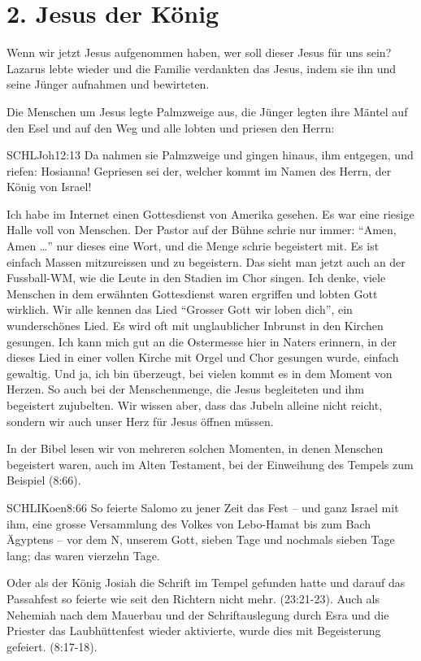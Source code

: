 \documentclass[fontsize=16pt]{mybib}
\begin{document}
    \section{2. Jesus der König}
    Wenn wir jetzt Jesus aufgenommen haben, wer soll dieser Jesus für uns sein? Lazarus lebte wieder und die Familie verdankten das Jesus, indem sie ihn und seine Jünger aufnahmen und bewirteten.

    Die Menschen um Jesus legte Palmzweige aus, die Jünger legten ihre Mäntel auf den Esel und auf den Weg und alle lobten und priesen den Herrn:
    \begin{bibelbox}{SCHL}{Joh}{12:13}
    Da nahmen sie Palmzweige und gingen hinaus, ihm entgegen, und riefen: Hosianna! Gepriesen sei der, welcher kommt im Namen des Herrn, der König von Israel!
    \end{bibelbox}
    Ich habe im Internet einen Gottesdienst von Amerika gesehen. Es war eine riesige Halle voll von Menschen. Der Pastor auf der Bühne schrie nur immer: \enquote{Amen, Amen \dots} nur dieses eine Wort, und die Menge schrie begeistert mit. Es ist einfach Massen mitzureissen und zu begeistern. Das sieht man jetzt auch an der Fussball-WM, wie die Leute in den Stadien im Chor singen.
    Ich denke, viele Menschen in dem erwähnten Gottesdienst waren ergriffen und lobten Gott wirklich.
    Wir alle kennen das Lied \enquote{Grosser Gott wir loben dich}, ein wunderschönes Lied. Es wird oft mit unglaublicher Inbrunst in den Kirchen gesungen. Ich kann mich gut an die Ostermesse hier in Naters erinnern, in der dieses Lied in einer vollen Kirche mit Orgel und Chor gesungen wurde, einfach gewaltig. Und ja, ich bin überzeugt, bei vielen kommt es in dem Moment von Herzen. So auch bei der Menschenmenge, die Jesus begleiteten und ihm begeistert zujubelten. Wir wissen aber, dass das Jubeln alleine nicht reicht, sondern wir auch unser Herz für Jesus öffnen müssen.

    In der Bibel lesen wir von mehreren solchen Momenten, in denen Menschen begeistert waren, auch im Alten Testament, bei der Einweihung des Tempels zum Beispiel (8:66). 
    \begin{bibelbox}{SCHL}{IKoen}{8:66}
        So feierte Salomo zu jener Zeit das Fest -- und ganz Israel mit ihm, eine grosse Versammlung des Volkes von Lebo-Hamat bis zum Bach Ägyptens -- vor dem \herr N, unserem Gott, sieben Tage und nochmals sieben Tage lang; das waren vierzehn Tage.
    \end{bibelbox}
    Oder als der König Josiah die Schrift im Tempel gefunden hatte und darauf das Passahfest so feierte wie seit den Richtern nicht mehr. (23:21-23).
    Auch als Nehemiah nach dem Mauerbau und der Schriftauslegung durch Esra und die Priester das Laubhüttenfest wieder aktivierte, wurde dies mit Begeisterung gefeiert. (8:17-18).
\end{document}
